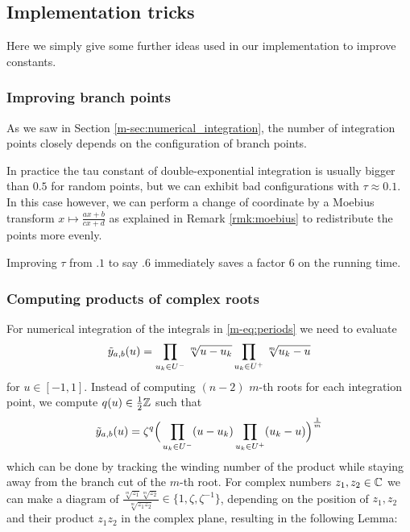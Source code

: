 \documentclass[main.tex]{subfiles}
\begin{document}
   \subsection{Implementation tricks}

   Here we simply give some further ideas used in our implementation to improve constants.

   \subsubsection{Improving branch points}

   As we saw in Section \ref{m-sec:numerical_integration}, the number of integration points
   closely depends on the configuration of branch points.

   In practice the tau constant of double-exponential integration is usually bigger than $0.5$
   for random points, but we can exhibit bad configurations with $τ\approx 0.1$.
   In this case however, we can perform a change of coordinate by a Moebius transform
   $x\mapsto \frac{ax+b}{cx+d}$ as explained in Remark \ref{rmk:moebius} to redistribute the points more evenly.

   Improving $τ$ from $.1$ to say $.6$ immediately saves a factor $6$ on the running time.

  \subsubsection{Computing products of complex roots}\label{subsec:computing_roots}

  For numerical integration of the integrals in \eqref{m-eq:periods}
  we need to evaluate
  \begin{equation*}
   \tilde{y}_{a,b}(u) = \prod_{u_k\in U^-} \sqrt[m]{u-u_k}\prod_{u_k\in U^+}\sqrt[m]{u_k-u}
  \end{equation*}
  for $u \in [-1,1]$. Instead of computing $(n-2)$ $m$-th roots for each
  integration point, we compute $q(u)\in\frac12\mathbb{Z}$ such that
  \begin{equation*}
   \tilde{y}_{a,b}(u) = \zeta^q \Big( \prod_{u_k\in U^-}(u-u_k) \prod_{u_k\in U^+} (u_k-u) \Big)^{\frac{1}{m}}
  \end{equation*}
 which can be done by tracking
  the winding number of the product while staying away from the branch cut
  of the $m$-th root.
  For complex numbers $z_1,z_2 \in \mathbb{C}$ we can make a diagram of
  $\frac{\sqrt[m]{z_1}\sqrt[m]{z_2}}{\sqrt[m]{z_1z_2}} \in \{ 1, \zeta,
  \zeta^{-1} \}$, depending on the position of $z_1,z_2$ and their product
  $z_1z_2$ in the complex plane, resulting in the following Lemma:
\end{document}
